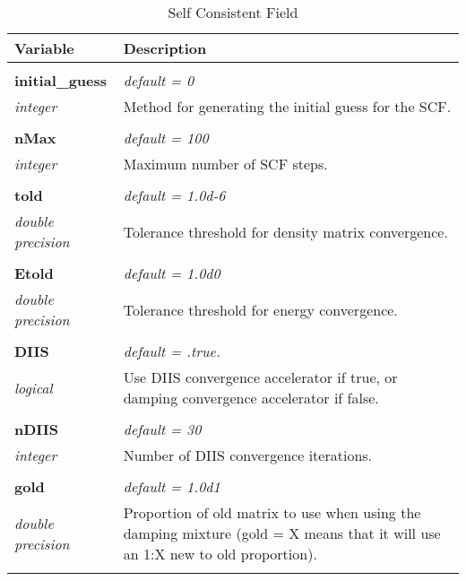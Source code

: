 \begin{Spacing}{1.0}
\begin{longtable}{ p{} p{} }

   \toprule
   \textbf{Variable} & Description \\*
   \midrule \\*
   \endhead

   \bottomrule
   \caption{Self Consistent Field}
   \endfoot

   \textbf{initial\_guess}
   &  \textit{default = 0}
   \\*\textit{integer}
   & Method for generating the initial guess for the
   SCF.\\* \\

   \textbf{nMax}
   &  \textit{default = 100}
   \\*\textit{integer}
   & Maximum number of SCF steps.\\* \\

   \textbf{told}
   &  \textit{default = 1.0d-6}
   \\*\textit{double precision}
   & Tolerance threshold for density matrix convergence.\\* \\

   \textbf{Etold}
   &  \textit{default = 1.0d0}
   \\*\textit{double precision}
   & Tolerance threshold for energy convergence.\\* \\

   \textbf{DIIS}
   &  \textit{default = .true. }
   \\*\textit{logical}
   & Use DIIS convergence accelerator if true, or damping
   convergence accelerator if false.\\* \\

   \textbf{nDIIS}
   &  \textit{default = 30}
   \\*\textit{integer}
   & Number of DIIS convergence iterations.\\* \\

   \textbf{gold}
   &  \textit{default = 1.0d1}
   \\*\textit{double precision}
   & Proportion of old matrix to use when using the damping
   mixture (gold = X means that it will use an 1:X new to
   old proportion).\\* \\


\end{longtable}
\end{Spacing}
